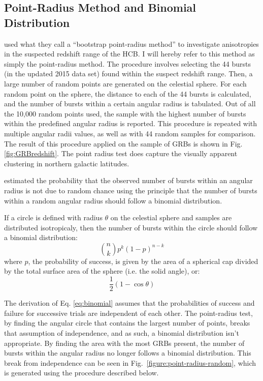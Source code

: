 \documentclass[fleqn,usenatbib]{mnras}
\begin{document}
\subsection{Point-Radius Method and Binomial Distribution}
\label{sec:prmethod} %
\citet{horvath2014} used what they call a ``bootstrap point-radius method'' to investigate anisotropies in the suspected redshift range of the HCB. I will hereby refer to this method as simply the point-radius method.
The procedure involves selecting the 44 bursts (in the updated 2015 data set) found within the suspect redshift range. Then, a large number of random points are generated on the celestial sphere. For each random point on the sphere, the distance to each of the 44 bursts is calculated, and the number of bursts within a certain angular radius is tabulated. Out of all the 10,000 random points used, the sample with the highest number of bursts within the predefined angular radius is reported. This procedure is repeated with multiple angular radii values, as well as with 44 random samples for comparison. The result of this procedure applied on the \citet{horvath2015} sample of GRBs is shown in Fig. \ref{fig:GRBredshift}. The point radius test does capture the visually apparent clustering in northern galactic latitudes.

\citet{horvath2014} estimated the probability that the observed number of bursts within an angular radius is not due to random chance using the principle that the number of bursts within a random angular radius should follow a binomial distribution. 

If a circle is defined with radius $\theta$ on the celestial sphere and samples are distributed isotropicaly, then the number of bursts within the circle should follow a binomial distribution:
\begin{equation}
    \binom{n}{k} p^{k}(1-p)^{n-k}
    \label{eq:binomial}
\end{equation}
where $p$, the probability of success, is given by the area of a spherical cap divided by the total surface area of the sphere (i.e. the solid angle), or:
\begin{equation}
    \frac{1}{2}(1-\cos{\theta})
    \label{eq:sphericalcap}
\end{equation}

The derivation of Eq. \ref{eq:binomial} assumes that the probabilities of success and failure for successive trials are independent of each other. The point-radius test, by finding the angular circle that contains the largest number of points, breaks that assumption of independence, and as such, a binomial distribution isn't appropriate. By finding the area with the most GRBs present, the number of bursts within the angular radius no longer follows a binomial distribution. This break from independence can be seen in Fig.~\ref{figure:point-radius-random}, which is generated using the procedure described below. 
\end{document}
